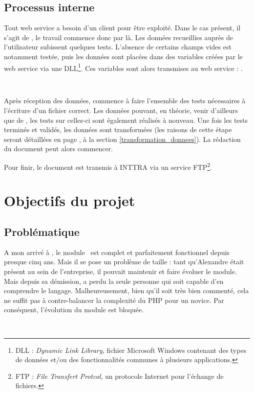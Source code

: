\subsection{Processus interne}
Tout web service a besoin d'un client pour être exploité. Dans le cas présent, il s'agit de \integrale, le travail commence donc par là. Les données recueillies auprès de l'utilisateur subissent quelques tests. L'absence de certains champs vides est notamment testée, puis les données sont placées dans des variables créées par le web service via une DLL\footnote{DLL : \emph{Dynamic Link Library}, fichier Microsoft Windows contenant des types de données et/ou des fonctionnalités communes à plusieurs applications.}. Ces variables sont alors transmises au web service : \pireus.

~

Après réception des données, \pireus {} commence à faire l'ensemble des tests nécessaires à l'écriture d'un fichier correct. Les données pouvant, en théorie, venir d'ailleurs que de \integrale, les tests sur celles-ci sont également réalisés à nouveau. Une fois les tests terminés et validés, les données sont transformées (les raisons de cette étape seront détaillées en page \pageref{transformation_donnees}, à la section \ref{transformation_donnees}). La rédaction du document peut alors commencer.

Pour finir, le document est transmis à INTTRA via un service FTP\footnote{FTP : \emph{File Transfert Protcol}, un protocole Internet pour l'échange de fichiers.}.
	
	
\section{Objectifs du projet}
\subsection{Problématique}
A mon arrivé à \solulog, le module \pireus~est complet et parfaitement fonctionnel depuis presque cinq ans. Mais il se pose un problème de taille : tant qu'Alexandre était présent au sein de l'entreprise, il pouvait maintenir et faire évoluer le module. Mais depuis sa démission, \solulog{} a perdu la seule personne qui soit capable d'en comprendre le langage. Malheureusement, bien qu'il soit très bien commenté, cela ne suffit pas à contre-balancer la complexité du PHP pour un novice. Par conséquent, l'évolution du module est bloquée.

~

